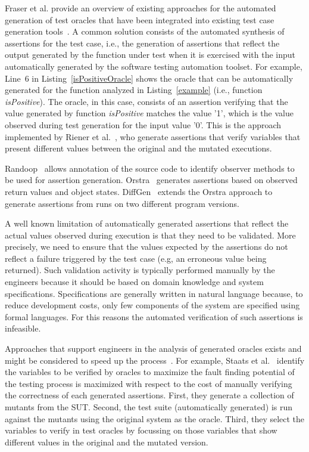 Fraser et al. provide an overview of existing approaches for the automated generation of test oracles that have been integrated into existing test case generation tools~\cite{fraser2011mutation}.
A common solution consists of the automated synthesis of assertions for the test case, i.e., the generation of assertions  that reflect the output generated by the function under test when it is exercised with the input automatically generated by the software testing automation toolset. 
For example, Line~6 in Listing~\ref{isPositiveOracle} shows the oracle that can be automatically generated for the function analyzed in Listing~\ref{example} (i.e., function \emph{isPositive}). The oracle, in this case, consists of an assertion verifying that the value generated by function \emph{isPositive} matches the value '1', which is the value observed during test generation for the input value '0'. This is the approach implemented by Riener et al.~\cite{riener2011test}, who generate assertions that verify variables that present different values between the original and the mutated executions.



Randoop~\cite{PachecoLEB2007} allows annotation of the source code to identify observer methods to be used for assertion generation. Orstra~\cite{Xie:2006} generates assertions based on observed return values and object states.
DiffGen~\cite{Taneja:2008} extends the Orstra approach to generate assertions from runs on two different program versions.

A well known limitation of automatically generated assertions that reflect the actual values observed during execution is that
they need to be validated. More precisely, we need to ensure that the values expected by the assertions do not reflect a failure triggered by the test case (e.g, an erroneous value being returned). Such validation activity is typically performed manually by the engineers because it should be based on domain knowledge and system specifications. 
Specifications are generally written in natural language because, to reduce development costs, only few components of the system are specified using formal languages. For this reasons the automated verification of such assertions is infeasible.

Approaches that support engineers in the analysis of generated oracles exists and might be considered to speed up the process~\cite{Staats2012,PastoreICSE2015}. For example, 
Staats et al.~\cite{Staats2012} identify the variables to be verified by oracles to maximize the fault finding potential of the testing process is maximized with respect to the cost of manually verifying the correctness of each generated assertions. First, they generate a collection of mutants from the SUT. Second, the test suite (automatically generated) is run against the mutants using the original system as the oracle. Third, they select the variables to verify in test oracles by focussing on those variables that show different values in the original and the mutated version.

